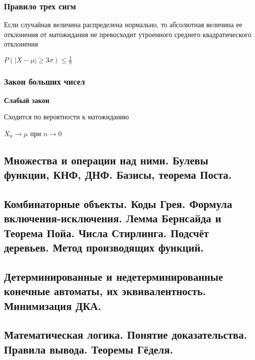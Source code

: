 \documentclass{article}
\begin{document}
\subsubsection{Правило трех сигм}

Если случайная величина распределена нормально, то абсолютная величина ее отклонения от матожидания не превосходит утроенного среднего квадратического отклонения

$P(|X - \mu| \ge 3 \sigma) \le \frac{1}{9}$


\subsubsection{Закон больших чисел}


{\bf Слабый закон}

Сходится по вероятности к матожиданию 

$\overline{X}_n \rightarrow \mu$ при $n \rightarrow 0$

\subsection{Множества и операции над ними. Булевы функции, КНФ, ДНФ. Базисы, теорема Поста.}

\subsection{Комбинаторные объекты. Коды Грея. Формула включения-исключения. Лемма Бернсайда и Теорема Пойа. Числа Стирлинга. Подсчёт деревьев. Метод производящих функций.}

\subsection{Детерминированные и недетерминированные конечные автоматы, их эквивалентность. Минимизация ДКА.}

\subsection{Математическая логика. Понятие доказательства. Правила вывода. Теоремы Гёделя.}
\end{document}
